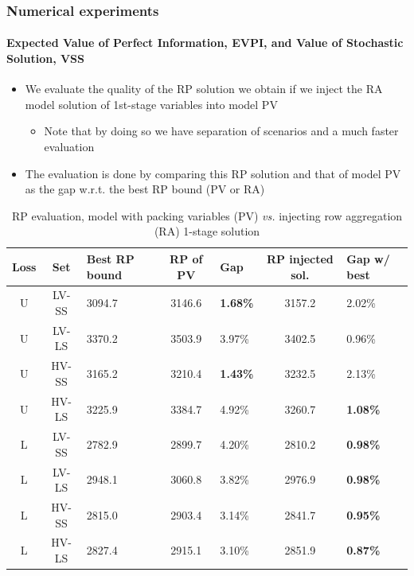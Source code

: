 \documentclass[9pt,xcolor={dvipsnames}]{beamer}
\begin{document}
\begin{frame}%
	\frametitle{Numerical experiments}
	\framesubtitle{Expected Value of Perfect Information, EVPI, and Value of Stochastic Solution, VSS}
	\begin{itemize}
		\footnotesize
		\item<1-> We evaluate the quality of the RP solution we obtain if we inject the RA model solution of 1st-stage variables into model PV
		\begin{itemize}
			\item<2-> Note that by doing so we have separation of scenarios and a much faster evaluation
		\end{itemize}
		\medskip 
		\item<3-> The evaluation is done by comparing this RP solution and that of model PV as the gap w.r.t. the best RP bound (PV or RA)
	\end{itemize}
	{
	\begin{table}[h!]
		\centering
		\footnotesize
		\begin{tabular}{c c j c f c f}
			\hline
			Loss &
			Set & 
			Best RP bound & 
			RP of PV &
			Gap & 
			RP injected sol. & 
			Gap w/ best \\
			\hline
			U & LV-SS & 3094.7 & 3146.6 & \textbf{1.68\%} & 3157.2 & 2.02\% \\
			U & LV-LS & 3370.2 & 3503.9 & 3.97\% & 3402.5 & 0.96\% \\
			U & HV-SS & 3165.2 & 3210.4 & \textbf{1.43\%} & 3232.5 & 2.13\% \\
			U & HV-LS & 3225.9 & 3384.7 & 4.92\% & 3260.7 & \textbf{1.08\%} \\
			\hline
			L & LV-SS & 2782.9 & 2899.7 & 4.20\% & 2810.2 & \textbf{0.98\%} \\
			L & LV-LS & 2948.1 & 3060.8 & 3.82\% & 2976.9 & \textbf{0.98\%} \\
			L & HV-SS & 2815.0 & 2903.4 & 3.14\% & 2841.7 & \textbf{0.95\%} \\
			L & HV-LS & 2827.4 & 2915.1 & 3.10\% & 2851.9 & \textbf{0.87\%} \\
			\hline
		\end{tabular}
		\caption{RP evaluation, model with packing variables (PV) \textit{vs.} injecting row aggregation (RA) 1-stage solution}
		\label{tab:optres4}
	\end{table}
	}
\end{frame}
\end{document}
